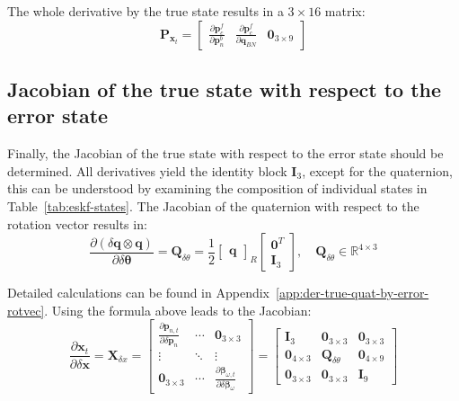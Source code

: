 The whole derivative by the true state results in a $3\times 16$ matrix:
\begin{equation}
    \mathbf{P}_{\mathbf{x}_t}=\begin{bmatrix}
     \frac{\partial\mathbf{p}_c^f}{\partial\mathbf{p}_n^b} & \frac{\partial\mathbf{p}_c^f}{\partial\mathbf{q}_{BN}} & \mathbf{0}_{3\times 9}
    \end{bmatrix}
    \label{eq:der-pc-by-xt}
\end{equation}

\subsection*{Jacobian of the true state with respect to the error state}

Finally, the Jacobian of the true state with respect to the error state should be determined. All derivatives yield the identity block $\mathbf{I}_3$, except for the quaternion, this can be understood by examining the composition of individual states in Table~\ref{tab:eskf-states}. The Jacobian of the quaternion with respect to the rotation vector results in:
\begin{equation}
    \frac{\partial(\delta\mathbf{q}\otimes \mathbf{q})}{\partial\delta\boldsymbol{\theta}} = \mathbf{Q}_{\delta\theta} = \frac{1}{2}\begin{bmatrix}
        \mathbf{q}
    \end{bmatrix}_R
    \begin{bmatrix}
        \mathbf{0}^T \\
        \mathbf{I}_3
    \end{bmatrix}, \quad \mathbf{Q}_{\delta\theta}\in\mathbb{R}^{4\times 3}
\end{equation}

Detailed calculations can be found in Appendix~\ref{app:der-true-quat-by-error-rotvec}. Using the formula above leads to the Jacobian:
\begin{equation}
    \frac{\partial\mathbf{x}_t}{\partial\delta\mathbf{x}} = \mathbf{X}_{\delta x}=\begin{bmatrix}
        \frac{\partial\mathbf{p}_{n,t}}{\partial\delta\mathbf{p}_n} & \cdots & \mathbf{0}_{3\times 3} \\ \vdots & \ddots & \vdots \\
        \mathbf{0}_{3\times 3} & \cdots & \frac{\partial\boldsymbol{\beta}_{\omega, t}}{\partial\delta\boldsymbol{\beta}_{\omega}}
    \end{bmatrix} = \begin{bmatrix}
        \mathbf{I}_3 & \mathbf{0}_{3\times 3} & \mathbf{0}_{3\times 3} \\
        \mathbf{0}_{4\times 3} & \mathbf{Q}_{\delta\theta} & \mathbf{0}_{4\times 9} \\
        \mathbf{0}_{3\times 3} & \mathbf{0}_{3\times 3} & \mathbf{I}_{9}
    \end{bmatrix}
\end{equation}

